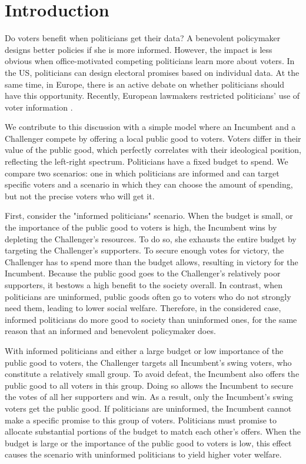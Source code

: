 \documentclass[12pt,english]{article}
\begin{document}
\newpage
\section{Introduction}
Do voters benefit when politicians get their data? A  benevolent policymaker designs better policies if she is more informed. However, the impact is less obvious when office-motivated competing politicians learn more about voters. In the US, politicians can design electoral promises based on individual data. At the same time, in Europe, there is an active debate on whether politicians should have this opportunity. Recently, European lawmakers restricted politicians' use of voter information \citep{brusselstimes2023}. 

We contribute to this discussion with a simple model where an Incumbent and a Challenger compete by offering a local public good to voters. Voters differ in their value of the public good, which perfectly correlates with their ideological position, reflecting the left-right spectrum. Politicians have a fixed budget to spend. We compare two scenarios: one in which politicians are informed and can target specific voters and a scenario in which they can choose the amount of spending, but not the precise voters who will get it. 

First, consider the "informed politicians" scenario. When the budget is small, or the importance of the public good to voters is high, the Incumbent wins by depleting the Challenger's resources. To do so, she exhausts the entire budget by targeting the Challenger's supporters. To secure enough votes for victory, the Challenger has to spend more than the budget allows, resulting in victory for the Incumbent. Because the public good goes to the Challenger's relatively poor supporters, it bestows a high benefit to the society overall.  In contrast, when politicians are uninformed, public goods often go to voters who do not strongly need them, leading to lower social welfare. Therefore, in the considered case, informed politicians do more good to society than uninformed ones, for the same reason that an informed and benevolent policymaker does.

With informed politicians and either a large budget or low importance of the public good to voters, the Challenger targets all Incumbent's swing voters, who constitute a relatively small group. To avoid defeat, the Incumbent also offers the public good to all voters in this group. Doing so allows the Incumbent to secure the votes of all her supporters and win. As a result, only the Incumbent's swing voters get the public good. If politicians are uninformed, the Incumbent cannot make a specific promise to this group of voters. Politicians must promise to allocate substantial portions of the budget to match each other's offers. When the budget is large or the importance of the public good to voters is low, this effect causes the scenario with uninformed politicians to yield higher voter welfare. 
\end{document}

